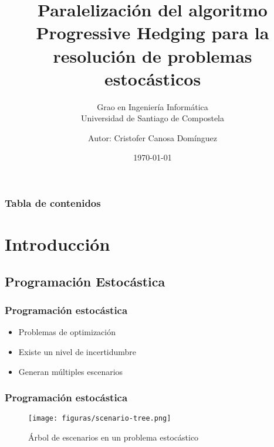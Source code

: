 \documentclass{beamer}
\begin{document}
\title{Paralelización del algoritmo Progressive Hedging para la resolución de problemas estocásticos}
\subtitle{Grao en Ingeniería Informática \\
Universidad de Santiago de Compostela}  
\author{Autor: Cristofer Canosa Domínguez}
\date{\today} 

\begin{frame}
\titlepage
\end{frame}

\begin{frame}
\frametitle{Tabla de contenidos}\tableofcontents
\end{frame} 

\section{Introducción}

\subsection{Programación Estocástica}

\begin{frame}
    \frametitle{Programación estocástica}
    \begin{itemize}
        \item Problemas de optimización \pause
        \item Existe un nivel de incertidumbre \pause
        \item Generan múltiples escenarios
    \end{itemize}
\end{frame}

\begin{frame}
    \frametitle{Programación estocástica}
    \begin{figure}[H]
        \centerline{\texttt{[image: figuras/scenario-tree.png]}}
        \caption{Árbol de escenarios en un problema estocástico}
        \label{fig:scenario-tree}
    \end{figure}
\end{frame}
\end{document}
